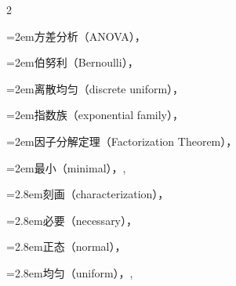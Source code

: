 \begin{multicols}{2}
\par\noindent\hangindent=2em\hspace*{1em}\label{idx:1001}方差分析（ANOVA），\hyperref[item:11.6.a]{\pageref*{item:11.6.a}}\par
\par\noindent\hangindent=2em\hspace*{1em}\label{idx:1002}伯努利（Bernoulli），\hyperref[ex:6.2.3]{\pageref*{ex:6.2.3}}\par
\par\noindent\hangindent=2em\hspace*{1em}\label{idx:1003}离散均匀（discrete uniform），\hyperref[ex:6.2.8]{\pageref*{ex:6.2.8}}\par
\par\noindent\hangindent=2em\hspace*{1em}\label{idx:1004}指数族（exponential family），\hyperref[thm:6.2.10]{\pageref*{thm:6.2.10}}\par
\par\noindent\hangindent=2em\hspace*{1em}\label{idx:1005}因子分解定理（Factorization Theorem），\hyperref[thm:6.2.6]{\pageref*{thm:6.2.6}}\par
\par\noindent\hangindent=2em\hspace*{1em}\label{idx:1006}最小（minimal），\hyperref[def:6.2.11]{\pageref*{def:6.2.11}}, \hyperref[exercise:6.26]{\pageref*{exercise:6.26}}\par
\par\noindent\hangindent=2.8em\hspace*{1.8em}\label{idx:1007}刻画（characterization），\hyperref[thm:6.2.13]{\pageref*{thm:6.2.13}}\par
\par\noindent\hangindent=2.8em\hspace*{1.8em}\label{idx:1008}必要（necessary），\hyperref[thm:6.6.4]{\pageref*{thm:6.6.4}}\par
\par\noindent\hangindent=2.8em\hspace*{1.8em}\label{idx:1009}正态（normal），\hyperref[ex:6.2.14]{\pageref*{ex:6.2.14}}\par
\par\noindent\hangindent=2.8em\hspace*{1.8em}\label{idx:1010}均匀（uniform），\hyperref[ex:6.2.15]{\pageref*{ex:6.2.15}}, \hyperref[exercise:6.10]{\pageref*{exercise:6.10}}\par

\end{multicols}
